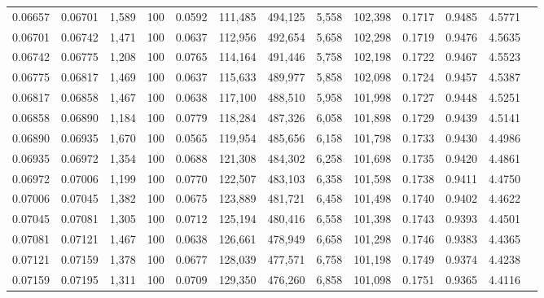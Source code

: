 \begin{tabular}{rrrrrrrrrrrrr}
0.06657 & 0.06701 & 1,589 & 100 &                                     0.0592 & 111,485 & 494,125 &   5,558 & 102,398 & 0.1717 & 0.9485 & 4.5771 \\
0.06701 & 0.06742 & 1,471 & 100 &                                     0.0637 & 112,956 & 492,654 &   5,658 & 102,298 & 0.1719 & 0.9476 & 4.5635 \\
0.06742 & 0.06775 & 1,208 & 100 &                                     0.0765 & 114,164 & 491,446 &   5,758 & 102,198 & 0.1722 & 0.9467 & 4.5523 \\
0.06775 & 0.06817 & 1,469 & 100 &                                     0.0637 & 115,633 & 489,977 &   5,858 & 102,098 & 0.1724 & 0.9457 & 4.5387 \\
0.06817 & 0.06858 & 1,467 & 100 &                                     0.0638 & 117,100 & 488,510 &   5,958 & 101,998 & 0.1727 & 0.9448 & 4.5251 \\
0.06858 & 0.06890 & 1,184 & 100 &                                     0.0779 & 118,284 & 487,326 &   6,058 & 101,898 & 0.1729 & 0.9439 & 4.5141 \\
0.06890 & 0.06935 & 1,670 & 100 &                                     0.0565 & 119,954 & 485,656 &   6,158 & 101,798 & 0.1733 & 0.9430 & 4.4986 \\
0.06935 & 0.06972 & 1,354 & 100 &                                     0.0688 & 121,308 & 484,302 &   6,258 & 101,698 & 0.1735 & 0.9420 & 4.4861 \\
0.06972 & 0.07006 & 1,199 & 100 &                                     0.0770 & 122,507 & 483,103 &   6,358 & 101,598 & 0.1738 & 0.9411 & 4.4750 \\
0.07006 & 0.07045 & 1,382 & 100 &                                     0.0675 & 123,889 & 481,721 &   6,458 & 101,498 & 0.1740 & 0.9402 & 4.4622 \\
0.07045 & 0.07081 & 1,305 & 100 &                                     0.0712 & 125,194 & 480,416 &   6,558 & 101,398 & 0.1743 & 0.9393 & 4.4501 \\
0.07081 & 0.07121 & 1,467 & 100 &                                     0.0638 & 126,661 & 478,949 &   6,658 & 101,298 & 0.1746 & 0.9383 & 4.4365 \\
0.07121 & 0.07159 & 1,378 & 100 &                                     0.0677 & 128,039 & 477,571 &   6,758 & 101,198 & 0.1749 & 0.9374 & 4.4238 \\
0.07159 & 0.07195 & 1,311 & 100 &                                     0.0709 & 129,350 & 476,260 &   6,858 & 101,098 & 0.1751 & 0.9365 & 4.4116 \\

\end{tabular}

